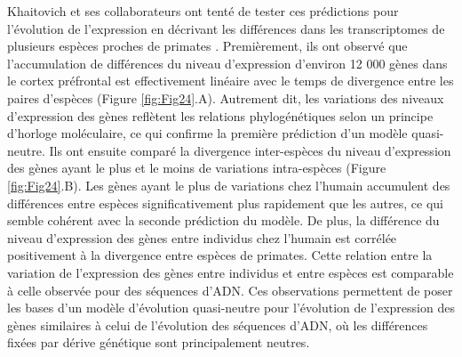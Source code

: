 Khaitovich et ses collaborateurs ont tenté de tester ces prédictions pour l’évolution de l’expression en décrivant les différences dans les \glspl{transcriptome} de plusieurs espèces proches de primates \citep{khaitovich_neutral_2004}. Premièrement, ils ont observé que l’accumulation de différences du niveau d’expression d’environ 12 000 gènes dans le cortex préfrontal est effectivement linéaire avec le temps de divergence entre les paires d’espèces (Figure \ref{fig:Fig24}.A). Autrement dit, les variations des niveaux d’expression des gènes reflètent les relations phylogénétiques selon un principe d’horloge moléculaire, ce qui confirme la première prédiction d’un modèle quasi-neutre. Ils ont ensuite comparé la divergence inter-espèces du niveau d’expression des gènes ayant le plus et le moins de variations intra-espèces (Figure \ref{fig:Fig24}.B). Les gènes ayant le plus de variations chez l’humain accumulent des différences entre espèces significativement plus rapidement que les autres, ce qui semble cohérent avec la seconde prédiction du modèle. De plus, la différence du niveau d’expression des gènes entre individus chez l’humain est corrélée positivement à la divergence entre espèces de primates. Cette relation entre la variation de l’expression des gènes entre individus et entre espèces est comparable à celle observée pour des séquences d’ADN. Ces observations permettent de poser les bases d’un modèle d’évolution quasi-neutre pour l’évolution de l’expression des gènes similaires à celui de l’évolution des séquences d’ADN, où les différences fixées par dérive génétique sont principalement neutres.


